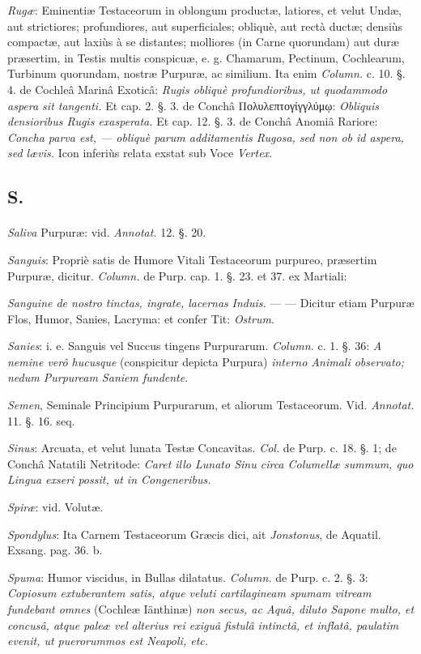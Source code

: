 \documentclass[a4paper, 11pt, oneside, polutonikogreek, german]{article}
\begin{document}
\emph{Rugæ}: Eminentiæ Testaceorum in oblongum productæ, latiores, et velut Undæ, aut strictiores; profundiores, aut superficiales; obliquè, aut rectà ductæ; densiùs compactæ, aut laxiùs à se distantes; molliores (in Carne quorundam) aut duræ præsertim, in Testis multis conspicuæ, e. g. Chamarum, Pectinum, Cochlearum, Turbinum quorundam, nostræ Purpuræ, ac similium. Ita enim \emph{Column.} c. 10. §. 4. de Cochleâ Marinâ Exoticâ: \emph{Rugis obliquè profundioribus, ut quodammodo aspera sit tangenti.} Et cap. 2. §. 3. de Conchâ Πολυλεπτογίγγλύμῳ: \emph{Obliquis densioribus Rugis exasperata.} Et cap. 12. §. 3. de Conchâ Anomiâ Rariore: \emph{Concha parva est, --- obliquè parum additamentis Rugosa, sed non ob id aspera, sed lævis.} Icon inferiùs relata exstat sub Voce \emph{Vertex}.

\subsection{S.}
\paragraph{}
\emph{Saliva} Purpuræ: vid. \emph{Annotat.} 12. §. 20.

\emph{Sanguis}: Propriè satis de Humore Vitali Testaceorum purpureo, præsertim Purpuræ, dicitur. \emph{Column.} de Purp. cap. 1. §. 23. et 37. ex Martiali:

\emph{Sanguine de nostro tinctas, ingrate, lacernas}  
\emph{Induis.} --- --- Dicitur etiam Purpuræ Flos, Humor, Sanies, Lacryma: et confer Tit: \emph{Ostrum}.

\emph{Sanies}: i. e. Sanguis vel Succus tingens Purpurarum. \emph{Column.} c. 1. §. 36: \emph{A nemine verô hucusque} (conspicitur depicta Purpura) \emph{interno Animali observato; nedum Purpuream Saniem fundente}.

\emph{Semen}, Seminale Principium Purpurarum, et aliorum Testaceorum. Vid. \emph{Annotat.} 11. §. 16. seq.

\emph{Sinus}: Arcuata, et velut lunata Testæ Concavitas. \emph{Col.} de Purp. c. 18. §. 1; de Conchâ Natatili Netritode: \emph{Caret illo Lunato Sinu circa Columellæ summum, quo Lingua exseri possit, ut in Congeneribus.}

\emph{Spiræ}: vid. Volutæ.

\emph{Spondylus}: Ita Carnem Testaceorum Græcis dici, ait \emph{Jonstonus}, de Aquatil. Exsang. pag. 36. b.

\emph{Spuma}: Humor viscidus, in Bullas dilatatus. \emph{Column.} de Purp. c. 2. §. 3: \emph{Copiosum extuberantem satis, atque veluti cartilagineam spumam vitream fundebant omnes} (Cochleæ Iänthinæ) \emph{non secus, ac Aquâ, diluto Sapone multo, et concusâ, atque paleæ vel alterius rei exiguâ fistulâ intinctâ, et inflatâ, paulatim evenit, ut puerorummos est Neapoli, etc.}
\end{document}
